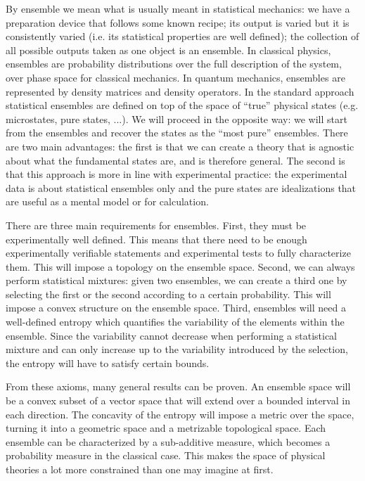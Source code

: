 By ensemble we mean what is usually meant in statistical mechanics: we have a preparation device that follows some known recipe; its output is varied but it is consistently varied (i.e. its statistical properties are well defined); the collection of all possible outputs taken as one object is an ensemble. In classical physics, ensembles are probability distributions over the full description of the system, over phase space for classical mechanics. In quantum mechanics, ensembles are represented by density matrices and density operators. In the standard approach statistical ensembles are defined on top of the space of ``true'' physical states (e.g. microstates, pure states, ...). We will proceed in the opposite way: we will start from the ensembles and recover the states as the ``most pure'' ensembles. There are two main advantages: the first is that we can create a theory that is agnostic about what the fundamental states are, and is therefore general. The second is that this approach is more in line with experimental practice: the experimental data is about statistical ensembles only and the pure states are idealizations that are useful as a mental model or for calculation.

There are three main requirements for ensembles. First, they must be experimentally well defined. This means that there need to be enough experimentally verifiable statements and experimental tests to fully characterize them. This will impose a topology on the ensemble space. Second, we can always perform statistical mixtures: given two ensembles, we can create a third one by selecting the first or the second according to a certain probability. This will impose a convex structure on the ensemble space. Third, ensembles will need a well-defined entropy which quantifies the variability of the elements within the ensemble. Since the variability cannot decrease when performing a statistical mixture and can only increase up to the variability introduced by the selection, the entropy will have to satisfy certain bounds.

From these axioms, many general results can be proven. An ensemble space will be a convex subset of a vector space that will extend over a bounded interval in each direction. The concavity of the entropy will impose a metric over the space, turning it into a geometric space and a metrizable topological space. Each ensemble can be characterized by a sub-additive measure, which becomes a probability measure in the classical case. This makes the space of physical theories a lot more constrained than one may imagine at first.

